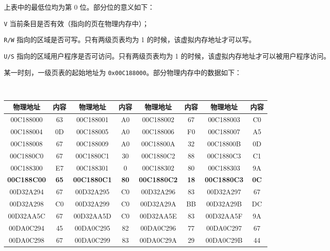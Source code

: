 \begin{problems}
        上表中的最低位均为第 0 位。部分位的意义如下：
        \begin{asparadesc}
            \item[\texttt{V}] 当前条目是否有效（指向的页在物理内存中）；
            \item[\texttt{R/W}] 指向的区域是否可写。只有两级页表均为 1 的时候，该虚拟内存地址才可以写。
            \item[\texttt{U/S}] 指向的区域用户程序是否可访问。只有两级页表均为 1 的时候，该虚拟内存地址才可以被用户程序访问。
        \end{asparadesc}

        某一时刻，一级页表的起始地址为 \verb|0x00C188000|。部分物理内存中的数据如下：
        \begin{table}[H]
            \tt
            \centering
            \begin{tabular}{|c|c|c|c|c|c|c|c|}
                \hline
                物理地址 & 内容 & 物理地址 & 内容 & 物理地址 & 内容 & 物理地址 & 内容 \\ \hline
                00C188000 & 63 & 00C188001 & A0 & 00C188002 & 67 & 00C188003 & C0 \\ \hline
                00C188004 & 0D & 00C188005 & A0 & 00C188006 & F0 & 00C188007 & A5 \\ \hline
                00C188008 & 67 & 00C188009 & A0 & 00C18800A & 32 & 00C18800B & 0D \\ \hline
                00C1880C0 & 67 & 00C1880C1 & 30 & 00C1880C2 & 88 & 00C1880C3 & C1 \\ \hline
                00C188300 & E7 & 00C188301 & 0 & 00C188302 & 80 & 00C188303 & 9A \\ \hline
                \textbf{00C188C00} & \textbf{65} & \textbf{00C1880C1} & \textbf{80} & \textbf{00C1880C2} & \textbf{18} & \textbf{00C1880C3} & \textbf{0C} \\ \hline
                00D32A294 & 67 & 00D32A295 & C0 & 00D32A296 & 83 & 00D32A297 & 67 \\ \hline
                00D32A298 & C0 & 00D32A299 & C0 & 00D32A29A & BB & 00D32A29B & DC \\ \hline
                00D32AA5C & 67 & 00D32AA5D & C0 & 00D32AA5E & 83 & 00D32AA5F & 9A \\ \hline
                00DA0C294 & 45 & 00DA0C295 & 82 & 00DA0C296 & 77 & 00DA0C297 & 67 \\ \hline
                00DA0C298 & 67 & 00DA0C299 & 83 & 00DA0C29A & 29 & 00DA0C29B & 44 \\ \hline

\end{tabular}
\end{table}
\end{problems}
